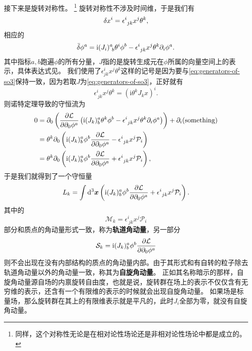 \documentclass[hyperref, UTF8, a4paper]{ctexart}
\newcommand*{\ii}{\mathrm{i}}
\renewcommand{\autoref}{\prettyref}
\begin{document}
接下来是旋转对称性。%
\footnote{同样，这个对称性无论是在相对论性场论还是非相对论性场论中都是成立的。}%
旋转对称性不涉及时间维，于是我们有
\[
    \var{x^i} = \epsilon^i_{\ jk}  x^j \theta^k,
\]
相应的
\[
    \bar{\var}{\phi^a} = \ii (J_i)^a_{\ b} \theta^i \phi^b - \epsilon^i_{\ jk}  x^j \theta^k \partial_i \phi^a.
\]
其中指标$a,b$跑遍$\phi$的所有分量，$J$指的是旋转生成元在$\phi$所属的向量空间上的表示，具体表达式见\autoref{sec:rotation}。
我们使用了$\epsilon^i_{jk}  x^j \theta^k$这样的记号是因为要与\eqref{eq:generators-of-so3}保持一致，因为若取$J$为\eqref{eq:generators-of-so3}，正好就有
\[
    \epsilon^i_{\ jk}  x^j \theta^k = (\ii \theta^k J_k x)^i.
\]
则诺特定理导致的守恒流为
\[
    \begin{aligned}
        0 &= \partial_0 \left( \pdv{\mathcal{L}}{\partial_0 \phi^a} \left( \ii (J_k)^a_b \theta^k \phi^b - \epsilon^i_{\ jk}  x^j \theta^k \partial_i \phi^a \right) \right) + \partial_i (\text{something}) \\
        &= \theta^k \partial_0 \left( \ii (J_k)^a_b \phi^b \pdv{\mathcal{L}}{\partial_0 \phi^a} - \epsilon^i_{\ jk} x^j \mathcal{P}_i \right) \\
        &= \theta^k \partial_0 \left( \ii (J_k)^a_b \phi^b \pdv{\mathcal{L}}{\partial_0 \phi^a} + \epsilon^i_{\ jk} x^j \mathcal{P}_i \right),
    \end{aligned}
\]
于是我们就得到了一个守恒量 %
\begin{equation}
    L_k = \int \dd[3]{\vb*{x}} \left( \ii (J_k)^a_b \phi^b \pdv{\mathcal{L}}{\partial_0 \phi^a} + \epsilon^i_{\ jk} x^j \mathcal{P}_i \right).
    \label{eq:field-angular-momentum}
\end{equation}
其中的
\begin{equation}
    \mathcal{M}_k = \epsilon^i_{\ jk} x^j \mathcal{P}_i 
\end{equation}
部分和质点的角动量形式一致，称为\textbf{轨道角动量}，另一部分
\begin{equation}
    \mathcal{S}_k = \ii (J_k)^a_b \phi^b \pdv{\mathcal{L}}{\partial_0 \phi^a}
    \label{eq:spin-angular-momentum}
\end{equation}
则不会出现在没有内部结构的质点的角动量内部。由于其形式和有自转的粒子除去轨道角动量以外的角动量一致，称其为\textbf{自旋角动量}。
正如其名称暗示的那样，自旋角动量源自场的内禀旋转自由度，也就是说，旋转群在场上的表示不仅仅含有无穷维的表示，还含有一个有限维的表示的时候就会出现自旋角动量。
如果场是标量场，那么旋转群在其上的有限维表示就是平凡的，此时$J_i$全部为零，就没有自旋角动量。
\end{document}
